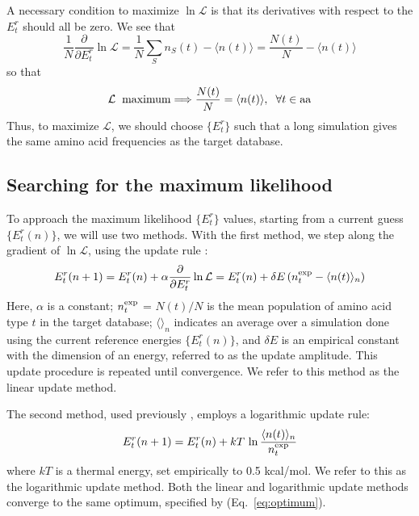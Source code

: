 \documentclass[12pt]{article}
\begin{document}
A necessary condition to maximize $\ln {\mathcal L}$ is that its derivatives with respect to the $E^r_t$ should
all be zero. We see that
\begin{equation}
\frac{1}{N} \frac{\partial}{\partial E^r_t} \ln {\mathcal L} = \frac{1}{N} \sum_S n_S(t) - \langle n(t) \rangle 
   = \frac{N(t)}{N} - \langle n(t) \rangle
\end{equation}
so that 
\begin{equation}  \label{eq:optimum}
{\mathcal L} \hspace*{2mm} {\rm maximum} \Longrightarrow \frac{N(t)}{N} = \langle n(t) \rangle, 
\hspace*{2mm} \forall t \in {\rm aa}
\end{equation}
Thus, to maximize ${\mathcal L}$, we should choose $\{E^r_t\}$ such that a long simulation gives the same
amino acid frequencies as the target database.

\subsection{Searching for the maximum likelihood}
To approach the maximum likelihood $\{E^r_t\}$ values, starting from a current guess $\{E^r_t(n)\}$, we will
use two methods. With the first method, we  step along the gradient of $\ln {\mathcal L}$, using the update
rule \cite{Kleinman06}:
\begin{equation} \label{eq:linear}
E^r_t (n+1) = E^r_t (n) + \alpha \frac{\partial}{\partial E^r_t} \ln {\mathcal L}
= E^r_t (n) + \delta E \, ( n_t^{\rm exp} - \langle n(t) \rangle_n)
\end{equation}
Here, $\alpha$ is a constant; $n_t^{\rm exp}$ = $N(t)/N$ is the mean population of amino acid type $t$ in the target
database; $\langle \rangle_n$ indicates an average over a simulation done using the current reference energies
$\{E^r_t(n)\}$, and $\delta E$ is an empirical constant with the dimension of an energy, referred to as the update
amplitude. This update procedure is repeated until convergence. We refer to this method as the linear update method.

The second method, used previously \cite{Schmidt08,Simonson13b}, employs a logarithmic update rule:
\begin{equation} \label{eq:log}
E^r_t (n+1) = E^r_t (n) + kT \, \ln \frac{\langle n(t) \rangle_n}{n_t^{\rm exp}}
\end{equation}
where $kT$ is a thermal energy, set empirically to 0.5 kcal/mol. We refer to this as the logarithmic update method.
Both the linear and logarithmic update methods converge to the same optimum, specified by (Eq.\ \ref{eq:optimum}). 
\end{document}
